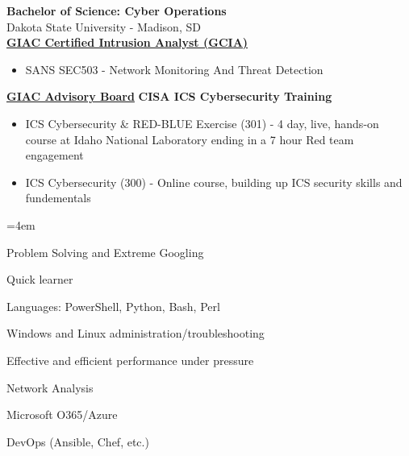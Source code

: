 \documentclass[a4paper,10pt]{article}
\begin{document}
\textbf{Bachelor of Science: Cyber Operations} \\
Dakota State University - Madison, SD \\
\href{https://www.credly.com/badges/87563fff-910c-449c-ab21-f571b162cd4b/public_url}{\textbf{GIAC Certified Intrusion Analyst (GCIA)}}
\begin{itemize}
    \small
    \leftskip=4em
    \item SANS SEC503 - Network Monitoring And Threat Detection
\end{itemize}
\href{https://www.credly.com/badges/a65cec63-e07c-4e52-b154-842564aadf65/public_url}{\textbf{GIAC Advisory Board}}
\textbf{CISA ICS Cybersecurity Training}
\begin{itemize}
    \small
    \leftskip=4em
    \item ICS Cybersecurity \& RED-BLUE Exercise (301) - 4 day, live, hands-on course at Idaho National Laboratory ending in a 7 hour Red team engagement 
    \item ICS Cybersecurity (300) - Online course, building up ICS security skills and fundementals
\end{itemize}
\begin{itemize}
    \begin{multicols}{2}
    \small
    \leftskip=4em
    \item Problem Solving and Extreme Googling
    \item Quick learner
    \item Languages: PowerShell, Python, Bash, Perl
    \item Windows and Linux administration/troubleshooting
    \item Effective and efficient performance under pressure
    \item Network Analysis
    \item Microsoft O365/Azure
    \item DevOps (Ansible, Chef, etc.)
    \end{multicols}
\end{itemize}
\end{document}
